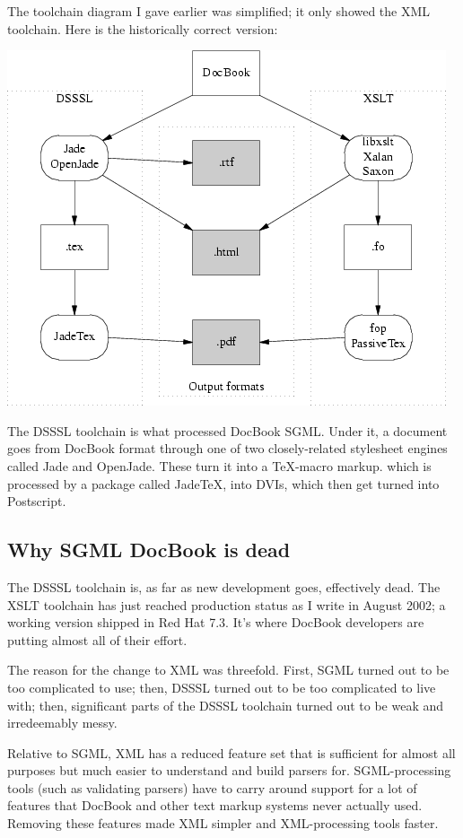 \documentclass[pdftex,english,a4paper,10pt]{infocom}
\begin{document}
The toolchain diagram I gave earlier was simplified; it
only showed the XML toolchain.  Here is the historically
correct version:

{{\includegraphics[]{figure4.png}}}

The DSSSL toolchain is what processed DocBook SGML.
Under it, a document goes from DocBook format through one of two
closely-related stylesheet engines called Jade and OpenJade.  These
turn it into a TeX-macro markup. which is processed by a package called
JadeTeX, into DVIs, which then get turned into Postscript.
\subsection{Why SGML DocBook is dead}
\label{id177916}\hypertarget{id177916}{}%

The DSSSL toolchain is, as far as new development goes,
effectively dead.  The XSLT toolchain has just reached production
status as I write in August 2002; a working version shipped in Red Hat
7.3.  It's where DocBook developers are putting almost all of their
effort.

The reason for the change to XML was threefold.  First,
SGML turned out to be too complicated to use; then, DSSSL turned out
to be too complicated to live with; then, significant parts of the
DSSSL toolchain turned out to be weak and irredeemably messy.

Relative to SGML, XML has a reduced feature set that is
sufficient for almost all purposes but much easier to understand and
build parsers for.  SGML-processing tools (such as validating parsers) have
to carry around support for a lot of features that DocBook and other
text markup systems never actually used.  Removing these features
made XML simpler and XML-processing tools faster.
\end{document}
